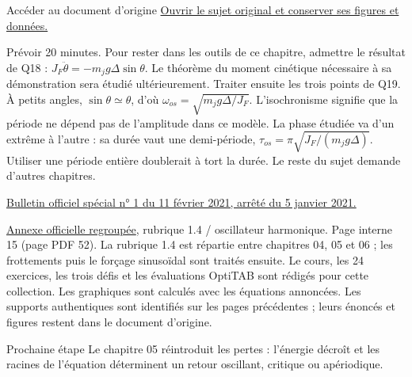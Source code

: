 \begin{loi}{Accéder au document d’origine}
\href{https://www.concours-commun-inp.fr/_resource/annales\%20\%C3\%A9crits/2024/MP/2024_MP2PC.pdf?download=true}{Ouvrir le sujet original et conserver ses figures et données.}
\end{loi}
Prévoir 20 minutes. Pour rester dans les outils de ce chapitre, admettre le résultat de Q18 : $J_F\ddot\theta=-m_jg\Delta\sin\theta$. Le théorème du moment cinétique nécessaire à sa démonstration sera étudié ultérieurement. Traiter ensuite les trois points de Q19.
À petits angles, $\sin\theta\simeq\theta$, d’où $\omega_{os}=\sqrt{m_jg\Delta/J_F}$. L’isochronisme signifie que la période ne dépend pas de l’amplitude dans ce modèle. La phase étudiée va d’un extrême à l’autre : sa durée vaut une demi-période, $\tau_{os}=\pi\sqrt{J_F/(m_jg\Delta)}$. Utiliser une période entière doublerait à tort la durée. Le reste du sujet demande d’autres chapitres.

\href{https://www.education.gouv.fr/bo/21/Special1/ESRS2035779A.htm}{Bulletin officiel spécial n° 1 du 11 février 2021, arrêté du 5 janvier 2021.}\par
\href{https://cache.media.education.gouv.fr/file/SPE1-MEN-MESRI-4-2-2021/64/8/spe779_annexe_1373648.pdf}{Annexe officielle regroupée}, rubrique 1.4 / oscillateur harmonique. Page interne 15 (page PDF 52). La rubrique 1.4 est répartie entre chapitres 04, 05 et 06 ; les frottements puis le forçage sinusoïdal sont traités ensuite.
Le cours, les 24 exercices, les trois défis et les évaluations OptiTAB sont rédigés pour cette collection. Les graphiques sont calculés avec les équations annoncées. Les supports authentiques sont identifiés sur les pages précédentes ; leurs énoncés et figures restent dans le document d’origine.
\begin{methode}{Prochaine étape}
Le chapitre 05 réintroduit les pertes : l’énergie décroît et les racines de l’équation déterminent un retour oscillant, critique ou apériodique.
\end{methode}

